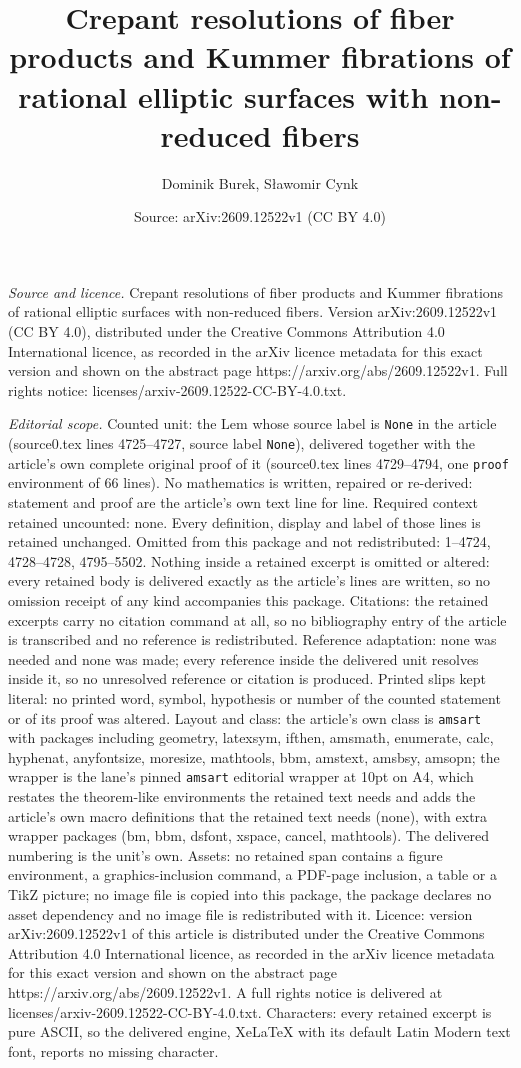 \documentclass[10pt,a4paper]{amsart}
\title[Crepant resolutions of fiber products and Kummer fibrations ]{Crepant resolutions of fiber products and Kummer fibrations of rational elliptic surfaces with non-reduced fibers}
\author{Dominik Burek, S{\l}awomir Cynk}
\date{Source: arXiv:2609.12522v1 (CC BY 4.0)}
\begin{document}
\maketitle

\noindent\emph{Source and licence.} Crepant resolutions of fiber products and Kummer fibrations of rational elliptic surfaces with non-reduced fibers. Version arXiv:2609.12522v1 (CC BY 4.0), distributed under the Creative Commons Attribution 4.0 International licence, as recorded in the arXiv licence metadata for this exact version and shown on the abstract page https://arxiv.org/abs/2609.12522v1. Full rights notice: licenses/arxiv-2609.12522-CC-BY-4.0.txt.\par\smallskip

\noindent\textit{Editorial scope.} Counted unit: the Lem whose source label is \texttt{None} in the article (source0.tex lines 4725--4727, source label \texttt{None}), delivered together with the article's own complete original proof of it (source0.tex lines 4729--4794, one \texttt{proof} environment of 66 lines). No mathematics is written, repaired or re-derived: statement and proof are the article's own text line for line. Required context retained uncounted: none. Every definition, display and label of those lines is retained unchanged. Omitted from this package and not redistributed: 1--4724, 4728--4728, 4795--5502. Nothing inside a retained excerpt is omitted or altered: every retained body is delivered exactly as the article's lines are written, so no omission receipt of any kind accompanies this package. Citations: the retained excerpts carry no citation command at all, so no bibliography entry of the article is transcribed and no reference is redistributed. Reference adaptation: none was needed and none was made; every reference inside the delivered unit resolves inside it, so no unresolved reference or citation is produced. Printed slips kept literal: no printed word, symbol, hypothesis or number of the counted statement or of its proof was altered. Layout and class: the article's own class is \texttt{amsart} with packages including geometry, latexsym, ifthen, amsmath, enumerate, calc, hyphenat, anyfontsize, moresize, mathtools, bbm, amstext, amsbsy, amsopn; the wrapper is the lane's pinned \texttt{amsart} editorial wrapper at 10pt on A4, which restates the theorem-like environments the retained text needs and adds the article's own macro definitions that the retained text needs (none), with extra wrapper packages (bm, bbm, dsfont, xspace, cancel, mathtools). The delivered numbering is the unit's own. Assets: no retained span contains a figure environment, a graphics-inclusion command, a PDF-page inclusion, a table or a TikZ picture; no image file is copied into this package, the package declares no asset dependency and no image file is redistributed with it. Licence: version arXiv:2609.12522v1 of this article is distributed under the Creative Commons Attribution 4.0 International licence, as recorded in the arXiv licence metadata for this exact version and shown on the abstract page https://arxiv.org/abs/2609.12522v1. A full rights notice is delivered at licenses/arxiv-2609.12522-CC-BY-4.0.txt. Characters: every retained excerpt is pure ASCII, so the delivered engine, XeLaTeX with its default Latin Modern text font, reports no missing character.
\end{document}
